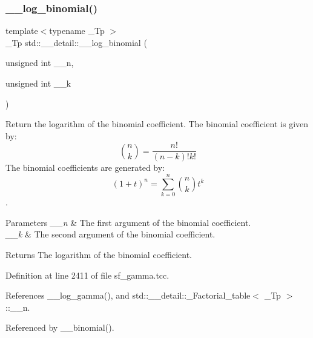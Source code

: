 \subsubsection{\texorpdfstring{\+\_\+\+\_\+log\+\_\+binomial()}{\_\_log\_binomial()}\hspace{0.1cm}{\footnotesize\ttfamily [1/2]}}
{\footnotesize\ttfamily template$<$typename \+\_\+\+Tp $>$ \\
\+\_\+\+Tp std\+::\+\_\+\+\_\+detail\+::\+\_\+\+\_\+log\+\_\+binomial (\begin{DoxyParamCaption}\item[{unsigned int}]{\+\_\+\+\_\+n,  }\item[{unsigned int}]{\+\_\+\+\_\+k }\end{DoxyParamCaption})}



Return the logarithm of the binomial coefficient. The binomial coefficient is given by\+: \[ \binom{n}{k} = \frac{n!}{(n-k)! k!} \] The binomial coefficients are generated by\+: \[ \left(1 + t\right)^n = \sum_{k=0}^n \binom{n}{k} t^k \]. 


\begin{DoxyParams}{Parameters}
{\em \+\_\+\+\_\+n} & The first argument of the binomial coefficient. \\
\hline
{\em \+\_\+\+\_\+k} & The second argument of the binomial coefficient. \\
\hline
\end{DoxyParams}
\begin{DoxyReturn}{Returns}
The logarithm of the binomial coefficient. 
\end{DoxyReturn}


Definition at line 2411 of file sf\+\_\+gamma.\+tcc.



References \+\_\+\+\_\+log\+\_\+gamma(), and std\+::\+\_\+\+\_\+detail\+::\+\_\+\+Factorial\+\_\+table$<$ \+\_\+\+Tp $>$\+::\+\_\+\+\_\+n.



Referenced by \+\_\+\+\_\+binomial().

\mbox{\label{namespacestd_1_1____detail_af8613458310f575d1a1b162553abe4aa}} 

